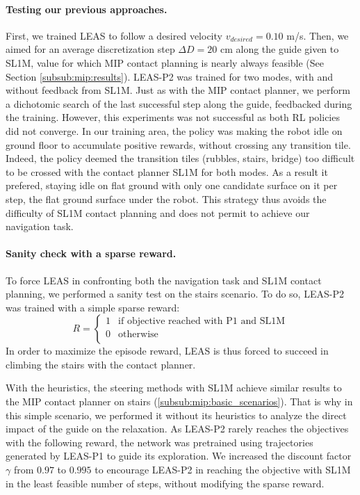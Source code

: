 \paragraph{Testing our previous approaches.}
First, we trained LEAS to follow a desired velocity $v_{desired}=0.10$ m/s. 
Then, we aimed for an average discretization step $\Delta D=20$ cm along the guide given to SL1M, value for which MIP contact planning is nearly always feasible (See Section \ref{subsub:mip:results}).
LEAS-P2 was trained for two modes, with and without feedback from SL1M. Just as with the MIP contact planner, we perform a dichotomic search of the last successful step along the guide, feedbacked during the training.
However, this experiments was not successful as both RL policies did not converge.
In our training area, the policy was making the robot idle on ground floor to accumulate positive rewards, without crossing any transition tile. 
Indeed, the policy deemed the transition tiles (rubbles, stairs, bridge) too difficult to be crossed with the contact planner SL1M for both modes.
As a result it prefered, staying idle on flat ground with only one candidate surface on it per step, the flat ground surface under the robot.
This strategy thus avoids the difficulty of SL1M contact planning and does not permit to achieve our navigation task.


\paragraph{Sanity check with a sparse reward.}
To force LEAS in confronting both the navigation task and SL1M contact planning, we performed a sanity test on the stairs scenario.
To do so, LEAS-P2 was trained with a simple sparse reward:
\begin{equation}
    R = \left\{
    \begin{array}{ll}
        1 & \mbox{if objective reached with P1 and SL1M}\\
        0 & \mbox{otherwise}\\
    \end{array}
\right.
\end{equation}
In order to maximize the episode reward, LEAS is thus forced to succeed in climbing the stairs with the contact planner.

With the heuristics, the steering methods with SL1M achieve similar results to the MIP contact planner on stairs (\ref{subsub:mip:basic_scenarios}).
That is why in this simple scenario, we performed it without its heuristics to analyze the direct impact of the guide on the relaxation.
As LEAS-P2 rarely reaches the objectives with the following reward, the network was pretrained using trajectories generated by LEAS-P1 to guide its exploration.
We increased the discount factor $\gamma$ from $0.97$ to $0.995$ to encourage LEAS-P2 in reaching the objective with SL1M in the least feasible number of steps, without modifying the sparse reward.

